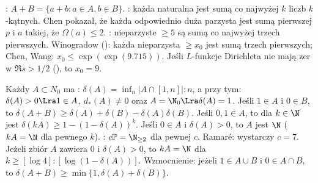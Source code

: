 :  $A + B = \{a+b : a \in A, b \in B\}$.
: każda naturalna jest sumą co najwyżej $k$ liczb $k$-kątnych.
Chen pokazał, że każda odpowiednio duża parzysta jest sumą pierwszej $p$ i $a$ takiej, że $\Omega(a) \le 2$.
: nieparzyste $\ge 5$ są sumą co najwyżej trzech pierwszych.
Winogradow (): każda nieparzysta $\ge x_0$ jest sumą trzech pierwszych; Chen, Wang: $x_0 \le \exp(\exp(9.715))$.
Jeśli $L$-funkcje Dirichleta nie mają zer w $\Re s> 1/2$ (), to $x_0 = 9$.

Każdy $A \subset N_0$ ma : $\delta(A) = \inf_{n} |A \cap [1, n]| : n$, a przy tym: $\delta(A) > 0 \Lra 1 \in A$, $d_*(A) \neq 0$ oraz $A = \N_0 \Lra \delta(A) = 1$.
Jeśli $1 \in A$ i $0 \in B$, to $\delta(A + B) \ge \delta(A) + \delta(B) - \delta(A)\delta(B)$.
Jeśli $0, 1 \in A$, to dla $k \in \N$ jest $\delta(kA) \ge 1- (1- \delta(A))^k$.
Jeśli $0 \in A$ i $\delta(A)>0$, to $A$ jest  $\N$ ($kA = \N$ dla pewnego $k$).
: $c \mathbb P = \N_{\ge 2}$ dla pewnej $c$.
Ramaré: wystarczy $c = 7$.
Jeżeli zbiór $A$ zawiera $0$ i $\delta(A) > 0$, to $kA = \N$ dla $k \ge [\log 4] : [\log (1- \delta(A))]$.
Wzmocnienie: jeżeli $1 \in A \cup B$ i $0 \in A \cap B$, to $\delta(A+B) \ge \min\{1, \delta(A) + \delta(B)\}$.







